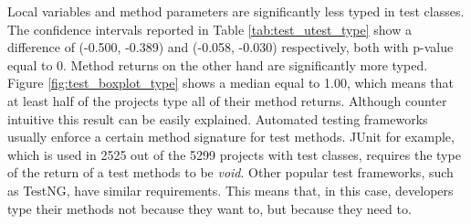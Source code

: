 \documentclass[preprint]{sigplanconf}
\begin{document}
Local variables and method parameters are significantly less typed in test classes.
The confidence intervals reported in Table \ref{tab:test_utest_type} show a difference of (-0.500, -0.389) and (-0.058, -0.030) respectively, both with p-value equal to 0.
Method returns on the other hand are significantly more typed.
Figure \ref{fig:test_boxplot_type} shows a median equal to 1.00, which means that at least half of the projects type all of their method returns.
Although counter intuitive this result can be easily explained.
Automated testing frameworks usually enforce a certain method signature for test methods.
JUnit for example, which is used in 2525 out of the 5299 projects with test classes, requires the type of the return of a test methods to be \emph{void}.
Other popular test frameworks, such as TestNG, have similar requirements.
This means that, in this case, developers type their methods not because they want to, but because they need to.
\end{document}
